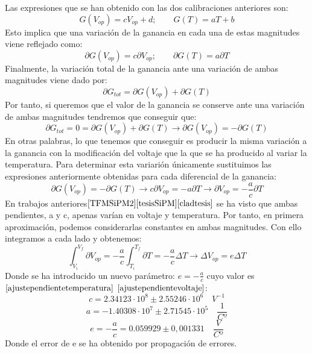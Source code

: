 Las expresiones que se han obtenido con las dos calibraciones anteriores son:
\begin{equation}
G(V_{op})=cV_{op}+d; \qquad G(T)=aT+b
\label{gananciatotal}
\end{equation}
Esto implica que una variación de la ganancia en cada una de estas magnitudes viene reflejado como:
\begin{equation}
\partial G(V_{op}) = c \partial V_{op}; \qquad \partial G(T) = a \partial T
\label{variacionparcialganancia}
\end{equation}
Finalmente, la variación total de la ganancia ante una variación de ambas magnitudes viene dado por:
\begin{equation}
\partial G_{tot} = \partial G(V_{op}) + \partial G(T)
\label{variaciontotalganancia}
\end{equation}
Por tanto, si queremos que el valor de la ganancia se conserve ante una variación de ambas magnitudes tendremos que conseguir que: 
\begin{equation}
\partial G_{tot} = 0 =  \partial G(V_{op}) + \partial G(T) \longrightarrow \partial G(V_{op}) = -\partial G(T)  
\label{basecompensacion}
\end{equation}
En otras palabras, lo que tenemos que conseguir es producir la misma variación a la ganancia con la modificación del voltaje que la que se ha producido al variar la temperatura. Para determinar esta variarión únicamente sustituimos las expresiones anteriormente obtenidas para cada diferencial de la ganancia:
\begin{equation}
\partial G(V_{op}) = - \partial G(T)  \longrightarrow c \partial V_{op}= - a \partial T \longrightarrow  \partial V_{op}= - \frac{a}{c} \partial T
\label{compensacionparciales}
\end{equation}
En trabajos anteriores$\cite{TFMSiPM2}\cite{tesisSiPM}\cite{cladtesis}$ se ha visto que ambas pendientes, a y c, apenas varían en voltaje y temperatura. Por tanto, en primera aproximación, podemos considerarlas constantes en ambas magnitudes. Con ello integramos a cada lado y obtenemos:
\begin{equation}
\int_{V_i}^{V_f} \partial V_{op}= - \frac{a}{c} \int_{T_i}^{T_f}\partial T = - \frac{a}{c} \Delta T \longrightarrow \Delta V_{op}= e \Delta T
\label{integral}
\end{equation}
Donde se ha introducido un nuevo parámetro: $e=-\frac{a}{c}$ cuyo valor es $\eqref{ajustependientetemperatura}$ $\eqref{ajustependientevoltaje}$:
\begin{equation}
c=2.34123 \cdot 10^8 \pm 2.55246 \cdot 10^6 \quad V^{-1}
\label{pendientevoltaje}
\end{equation}
\begin{equation}
a=-1.40308 \cdot 10^7 \pm 2.71545 \cdot 10^5 \quad \frac{1}{Cº}
\label{pendientetemperatura}
\end{equation}
\begin{equation}
e=-\frac{a}{c} = 0.059929 \pm 0,001331 \quad \frac{V}{Cº}
\label{pendientecompensacion}
\end{equation}
Donde el error de e se ha obtenido por propagación de errores. 

